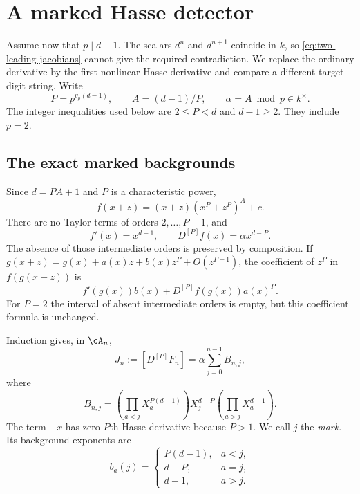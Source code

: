 \section{A marked Hasse detector}
\label{sec:hasse}

Assume now that $p\mid d-1$. The scalars $d^n$ and $d^{n+1}$
coincide in $k$, so \eqref{eq:two-leading-jacobians} cannot give
the required contradiction. We replace the ordinary derivative by
the first nonlinear Hasse derivative and compare a different
target digit string. Write
\begin{equation}
 P=p^{v_p(d-1)},\qquad A=(d-1)/P,\qquad
 \alpha=A\bmod p\in k^\times.
 \label{eq:hasse-parameters}
\end{equation}
The integer inequalities used below are
$2\le P<d$ and $d-1\ge2$. They include $p=2$.

\subsection{The exact marked backgrounds}

Since $d=PA+1$ and $P$ is a characteristic power,
\[
 f(x+z)=(x+z)(x^P+z^P)^A+c.
\]
There are no Taylor terms of orders $2,\ldots,P-1$, and
\begin{equation}
 f'(x)=x^{d-1},\qquad D^{[P]}f(x)=\alpha x^{d-P}.
 \label{eq:hasse-first-term}
\end{equation}
The absence of those intermediate orders is preserved by
composition. If
$g(x+z)=g(x)+a(x)z+b(x)z^P+O(z^{P+1})$, the coefficient
of $z^P$ in $f(g(x+z))$ is
\[
 f'(g(x))b(x)+D^{[P]}f(g(x))a(x)^P.
\]
For $P=2$ the interval of absent intermediate orders is empty,
but this coefficient formula is unchanged.

Induction gives, in $\cA_n$,
\begin{equation}
 J_n:=[D^{[P]}F_n]=\alpha\sum_{j=0}^{n-1}B_{n,j},
 \label{eq:marked-formula}
\end{equation}
where
\begin{equation}
 B_{n,j}=
 \left(\prod_{a<j}X_a^{P(d-1)}\right)X_j^{d-P}
 \left(\prod_{a>j}X_a^{d-1}\right).
 \label{eq:marked-background}
\end{equation}
The term $-x$ has zero $P$th Hasse derivative because $P>1$.
We call $j$ the \emph{mark}. Its background exponents are
\begin{equation}
 b_a(j)=
 \begin{cases}
  P(d-1),&a<j,\\
  d-P,&a=j,\\
  d-1,&a>j.
 \end{cases}
 \label{eq:background-digits}
\end{equation}

